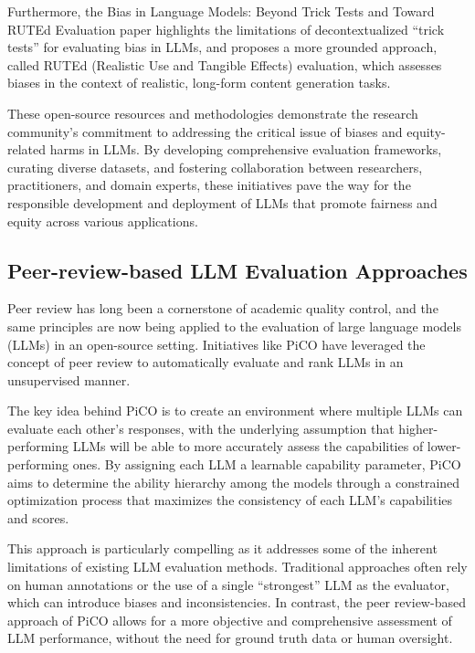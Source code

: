 \documentclass[11pt]{article}
\begin{document}
Furthermore, the Bias in Language Models: Beyond Trick Tests and Toward RUTEd Evaluation paper \cite{ref312} highlights the limitations of decontextualized ``trick tests'' for evaluating bias in LLMs, and proposes a more grounded approach, called RUTEd (Realistic Use and Tangible Effects) evaluation, which assesses biases in the context of realistic, long-form content generation tasks.

These open-source resources and methodologies demonstrate the research community's commitment to addressing the critical issue of biases and equity-related harms in LLMs. By developing comprehensive evaluation frameworks, curating diverse datasets, and fostering collaboration between researchers, practitioners, and domain experts, these initiatives pave the way for the responsible development and deployment of LLMs that promote fairness and equity across various applications.

\subsection{Peer-review-based LLM Evaluation Approaches}

Peer review has long been a cornerstone of academic quality control, and the same principles are now being applied to the evaluation of large language models (LLMs) in an open-source setting. Initiatives like PiCO \cite{ref84} have leveraged the concept of peer review to automatically evaluate and rank LLMs in an unsupervised manner.

The key idea behind PiCO is to create an environment where multiple LLMs can evaluate each other's responses, with the underlying assumption that higher-performing LLMs will be able to more accurately assess the capabilities of lower-performing ones. By assigning each LLM a learnable capability parameter, PiCO aims to determine the ability hierarchy among the models through a constrained optimization process that maximizes the consistency of each LLM's capabilities and scores.

This approach is particularly compelling as it addresses some of the inherent limitations of existing LLM evaluation methods. Traditional approaches often rely on human annotations or the use of a single ``strongest'' LLM as the evaluator, which can introduce biases and inconsistencies. In contrast, the peer review-based approach of PiCO allows for a more objective and comprehensive assessment of LLM performance, without the need for ground truth data or human oversight.
\end{document}
